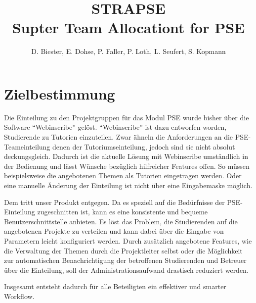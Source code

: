 \documentclass[parskip=full]{scrartcl}
\begin{document}
\title{\textbf{STRA\gls{PSE}}\\
        \large Supter Team Allocationt for \gls{PSE}}

\author{D. Biester, E. Dohse, P. Faller, P. Loth, L. Seufert, S. Kopmann}
        
\maketitle
 
\pagebreak
\tableofcontents
\pagebreak

\section{Zielbestimmung}

Die Einteilung zu den Projektgruppen für das Modul \gls{PSE} wurde
bisher über die Software \enquote{Webinscribe} gelöst.
\enquote{Webinscribe} ist dazu entworfen worden, Studierende zu Tutorien einzuteilen.
Zwar ähneln die Anforderungen an die \gls{PSE}-Teameinteilung denen der Tutoriumseinteilung,
jedoch sind sie nicht absolut deckungsgleich. 
Dadurch ist die aktuelle Lösung mit Webinscribe umständlich in der Bedienung und lässt Wünsche bezüglich hilfreicher Features offen.
So müssen beispielsweise die angebotenen Themen als Tutorien eingetragen werden. 
Oder eine manuelle Änderung der Einteilung ist nicht über eine Eingabemaske möglich.

Dem tritt unser Produkt entgegen.
Da es speziell auf die Bedürfnisse der \gls{PSE}-Einteilung zugeschnitten ist, 
kann es eine konsistente und bequeme Benutzerschnittstelle anbieten.
Es löst das Problem, die Studierenden auf die angebotenen Projekte zu verteilen und kann dabei über die Eingabe von Parametern leicht konfiguriert werden.
Durch zusätzlich angebotene Features, wie die Verwaltung der Themen durch die Projektleiter selbst 
oder die Möglichkeit zur automatischen Benachrichtigung der betroffenen Studierenden und Betreuer über die
Einteilung, soll der Administrationsaufwand drastisch reduziert werden. 

Insgesamt entsteht dadurch für alle Beteiligten ein effektiver und smarter Workflow.
\end{document}
